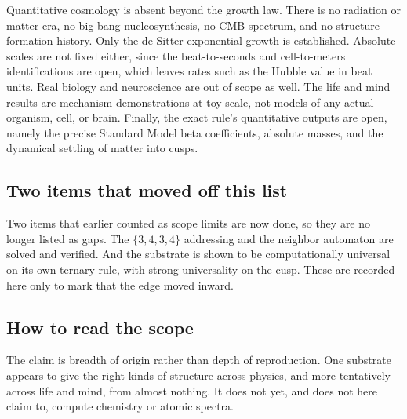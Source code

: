 Quantitative cosmology is absent beyond the growth law. There is no radiation or matter era, no big-bang nucleosynthesis, no CMB spectrum, and no structure-formation history. Only the de Sitter exponential growth is established. Absolute scales are not fixed either, since the beat-to-seconds and cell-to-meters identifications are open, which leaves rates such as the Hubble value in beat units. Real biology and neuroscience are out of scope as well. The life and mind results are mechanism demonstrations at toy scale, not models of any actual organism, cell, or brain. Finally, the exact rule's quantitative outputs are open, namely the precise Standard Model beta coefficients, absolute masses, and the dynamical settling of matter into cusps.

\subsection{Two items that moved off this list}

Two items that earlier counted as scope limits are now done, so they are no longer listed as gaps. The $\{3,4,3,4\}$ addressing and the neighbor automaton are solved and verified. And the substrate is shown to be computationally universal on its own ternary rule, with strong universality on the cusp. These are recorded here only to mark that the edge moved inward.

\subsection{How to read the scope}

The claim is breadth of origin rather than depth of reproduction. One substrate appears to give the right kinds of structure across physics, and more tentatively across life and mind, from almost nothing. It does not yet, and does not here claim to, compute chemistry or atomic spectra.
